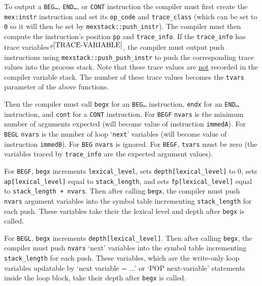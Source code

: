 \documentclass[12pt]{article}
\newcommand{\pagnote}[1]{$\,^{p\pageref{#1}}$}
\newcommand{\EOL}{\penalty \exhyphenpenalty}
\newenvironment{indpar}[1][0.3in]%
	{\begin{list}{}%
		     {\setlength{\itemsep}{0in}%
		      \setlength{\topsep}{0in}%
		      \setlength{\parsep}{1ex}%
		      \setlength{\labelwidth}{#1}%
		      \setlength{\leftmargin}{#1}%
		      \addtolength{\leftmargin}{\labelsep}}%
	 \item}%
	{\end{list}}
\begin{document}
\begin{indpar}
To output a {\tt BEG\ldots}, {\tt END\ldots}, or {\tt CONT} instruction
the compiler must first create the {\tt mex:instr} instruction and set
its {\tt op\_code} and {\tt trace\_class} (which can be set to {\tt 0}
so it will then be set by {\tt mexstack::push\_instr}).  The compiler must then
compute the instruction's position {\tt pp} and {\tt trace\_info}.
If the {\tt trace\_info} has
trace variables\pagnote{TRACE-VARIABLE}, the
compiler must output push instructions using
{\tt mexstack::\EOL push\_\EOL push\_\EOL instr}
to push the corresponding trace values into the process stack.
Note that these trace values are \underline{not} recorded in the
compiler variable stack.  The number of these trace values becomes
the {\tt tvars} parameter of the above functions.

Then the compiler must call {\tt begx} for an {\tt BEG\ldots} instruction,
{\tt endx} for an {\tt END\ldots} instruction, and {\tt cont} for
a {\tt CONT} instruction.  For {\tt BEGF} {\tt nvars} is the minimum number
of arguments expected (will become value of instruction {\tt immedA}).
For {\tt BEGL} {\tt nvars} is the number of loop `{\tt next}' variables
(will become value of instruction {\tt immedB}).  For {\tt BEG} {\tt nvars}
is ignored.  For {\tt BEGF}, {\tt tvars} must be zero (the variables traced
by {\tt trace\_info} are the expected argument values).

For {\tt BEGF}, {\tt begx} increments {\tt lexical\_level},
sets {\tt depth[lexical\_level]} to 0,
sets {\tt ap[lexical\_level]} equal to {\tt stack\_length},
and sets {\tt fp[lexical\_level]} equal to {\tt stack\_length + nvars}.
Then after calling {\tt begx}, the compiler
must push {\tt nvars} argument variables into the symbol table
incrementing {\tt stack\_length} for each push.  These variables
take their the lexical level and depth after {\tt begx} is called.

For {\tt BEGL}, {\tt begx} increments {\tt depth[lexical\_level]}.
Then after calling {\tt begx}, the compiler
must push {\tt nvars} `next' variables into the symbol table
incrementing {\tt stack\_\EOL length} for each push.  These variables,
which are the write-only loop variables updatable by `next variable = ...'
or `POP next-variable' statements inside the loop block,
take their depth after {\tt begx} is called.


\end{indpar}
\end{document}
